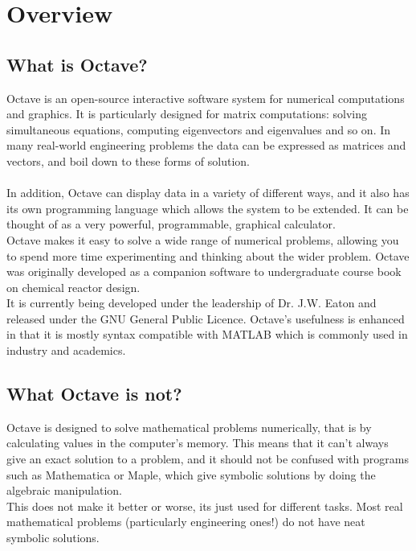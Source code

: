 \section{Overview}
\subsection{What is Octave?}
Octave is an open-source interactive software system for numerical computations and
graphics. It is particularly designed for matrix computations: solving simultaneous equations, computing eigenvectors and eigenvalues and so on. In many real-world engineering
problems the data can be expressed as matrices and vectors, and boil down to these forms
of solution.\\\\
In addition, Octave can display data in a variety of different ways, and it
also has its own programming language which allows the system to be extended. It can
be thought of as a very powerful, programmable, graphical calculator.\\
Octave makes it easy to solve a wide range of numerical problems, allowing you to spend more time
experimenting and thinking about the wider problem.
Octave was originally developed as a companion software to undergraduate course
book on chemical reactor design.\\
 It is currently being developed under the leadership of
Dr. J.W. Eaton and released under the GNU General Public Licence. Octave’s usefulness
is enhanced in that it is mostly syntax compatible with MATLAB which is commonly used
in industry and academics.
\subsection{ What Octave is not?}
Octave is designed to solve mathematical problems
numerically, that is by calculating values in the computer's memory. This means that it can't always give an exact solution
to a problem, and it should not be confused with programs such as Mathematica or Maple, which give symbolic
solutions by doing the algebraic manipulation. \\
This does not make it better or worse, its just used for different tasks. Most real mathematical problems
(particularly engineering ones!) do not have neat symbolic solutions.
